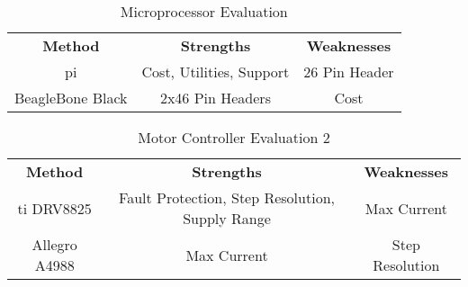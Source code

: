 \begin{table}[ht]
	\caption{Microprocessor Evaluation}
	\label{table:uPEval}
	\centering
	\begin{tabular}{|c c c|} 
		\hline\hline
		\textbf{Method} & \textbf{Strengths} & \textbf{Weaknesses}\\
		\gls{pi} & Cost, Utilities, Support & 26 Pin Header\\
		BeagleBone Black & 2x46 Pin Headers & Cost \\
	\hline 
	\end{tabular}
\end{table}

\begin{table}[ht]
	\caption{Motor Controller Evaluation 2}
	\label{table:MCEval 2}
	\centering
	\begin{tabular}{|c c c|} 
		\hline\hline
		\textbf{Method} & \textbf{Strengths} & \textbf{Weaknesses}\\
		\gls{ti} DRV8825 & Fault Protection, Step Resolution, Supply Range & Max Current\\
		Allegro A4988 & Max Current & Step Resolution\\
		\hline
	\end{tabular}
\end{table}
